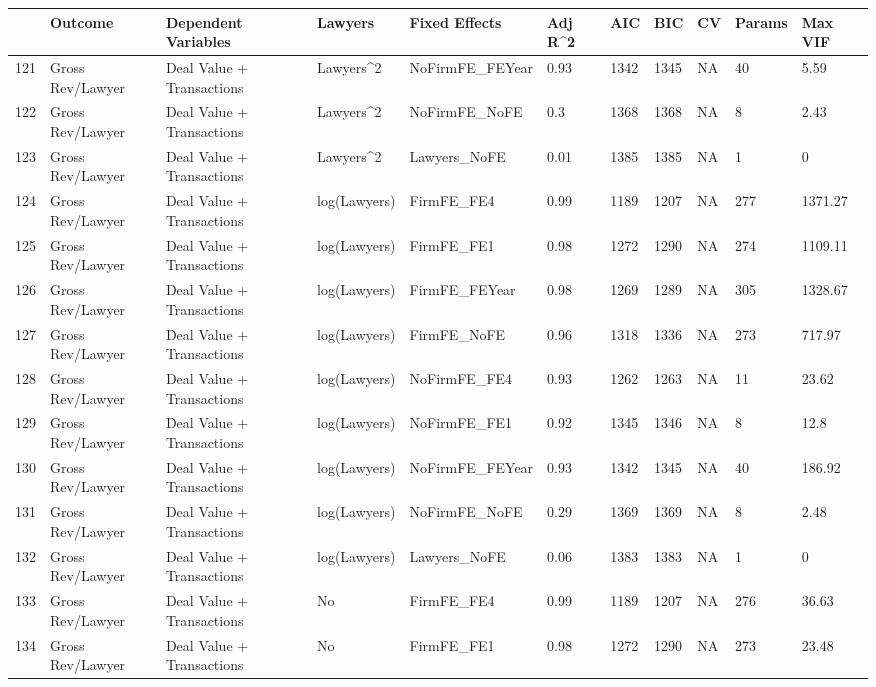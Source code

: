 \documentclass{article}
\begin{document}
\begin{table}[H]
\centering
\begin{tabular}{rllllllllll}
  \hline
 & Outcome & Dependent Variables & Lawyers & Fixed Effects & Adj R^2 & AIC & BIC & CV & Params & Max VIF \\ 
  \hline
121 & Gross Rev/Lawyer & Deal Value + Transactions & Lawyers^2 & NoFirmFE\_FEYear & 0.93 & 1342 & 1345 & NA & 40 & 5.59 \\ 
  122 & Gross Rev/Lawyer & Deal Value + Transactions & Lawyers^2 & NoFirmFE\_NoFE & 0.3 & 1368 & 1368 & NA & 8 & 2.43 \\ 
  123 & Gross Rev/Lawyer & Deal Value + Transactions & Lawyers^2 & Lawyers\_NoFE & 0.01 & 1385 & 1385 & NA & 1 & 0 \\ 
  124 & Gross Rev/Lawyer & Deal Value + Transactions & log(Lawyers) & FirmFE\_FE4 & 0.99 & 1189 & 1207 & NA & 277 & 1371.27 \\ 
  125 & Gross Rev/Lawyer & Deal Value + Transactions & log(Lawyers) & FirmFE\_FE1 & 0.98 & 1272 & 1290 & NA & 274 & 1109.11 \\ 
  126 & Gross Rev/Lawyer & Deal Value + Transactions & log(Lawyers) & FirmFE\_FEYear & 0.98 & 1269 & 1289 & NA & 305 & 1328.67 \\ 
  127 & Gross Rev/Lawyer & Deal Value + Transactions & log(Lawyers) & FirmFE\_NoFE & 0.96 & 1318 & 1336 & NA & 273 & 717.97 \\ 
  128 & Gross Rev/Lawyer & Deal Value + Transactions & log(Lawyers) & NoFirmFE\_FE4 & 0.93 & 1262 & 1263 & NA & 11 & 23.62 \\ 
  129 & Gross Rev/Lawyer & Deal Value + Transactions & log(Lawyers) & NoFirmFE\_FE1 & 0.92 & 1345 & 1346 & NA & 8 & 12.8 \\ 
  130 & Gross Rev/Lawyer & Deal Value + Transactions & log(Lawyers) & NoFirmFE\_FEYear & 0.93 & 1342 & 1345 & NA & 40 & 186.92 \\ 
  131 & Gross Rev/Lawyer & Deal Value + Transactions & log(Lawyers) & NoFirmFE\_NoFE & 0.29 & 1369 & 1369 & NA & 8 & 2.48 \\ 
  132 & Gross Rev/Lawyer & Deal Value + Transactions & log(Lawyers) & Lawyers\_NoFE & 0.06 & 1383 & 1383 & NA & 1 & 0 \\ 
  133 & Gross Rev/Lawyer & Deal Value + Transactions & No & FirmFE\_FE4 & 0.99 & 1189 & 1207 & NA & 276 & 36.63 \\ 
  134 & Gross Rev/Lawyer & Deal Value + Transactions & No & FirmFE\_FE1 & 0.98 & 1272 & 1290 & NA & 273 & 23.48 \\ 

\end{tabular}
\end{table}
\end{document}
